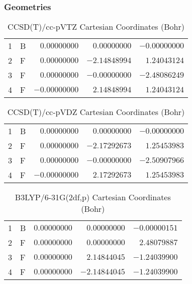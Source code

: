 \documentclass[10pt,oneside]{article}
\begin{document}
\clearpage

\subsection{\ \ \ }

\subsubsection*{Geometries}
\begin{table}[h!]
\centering
\caption{CCSD(T)/cc-pVTZ Cartesian Coordinates (Bohr)}
\begin{tabular}{llrrr}
1  & B  & $ 0.00000000$ & $ 0.00000000$ & $-0.00000000$ \\
2  & F  & $ 0.00000000$ & $-2.14848994$ & $ 1.24043124$ \\
3  & F  & $ 0.00000000$ & $-0.00000000$ & $-2.48086249$ \\
4  & F  & $-0.00000000$ & $ 2.14848994$ & $ 1.24043124$ \\
\end{tabular}
\end{table}

\begin{table}[h!]
\centering
\caption{CCSD(T)/cc-pVDZ Cartesian Coordinates (Bohr)}
\begin{tabular}{llrrr}
1  & B  & $ 0.00000000$ & $ 0.00000000$ & $-0.00000000$ \\
2  & F  & $ 0.00000000$ & $-2.17292673$ & $ 1.25453983$ \\
3  & F  & $ 0.00000000$ & $-0.00000000$ & $-2.50907966$ \\
4  & F  & $-0.00000000$ & $ 2.17292673$ & $ 1.25453983$ \\
\end{tabular}
\end{table}

\begin{table}[h!]
\centering
\caption{B3LYP/6-31G(2df,p) Cartesian Coordinates (Bohr)}
\begin{tabular}{llrrr}
1  & B  & $ 0.00000000$ & $ 0.00000000$ & $-0.00000151$ \\
2  & F  & $ 0.00000000$ & $ 0.00000000$ & $ 2.48079887$ \\
3  & F  & $ 0.00000000$ & $ 2.14844045$ & $-1.24039900$ \\
4  & F  & $ 0.00000000$ & $-2.14844045$ & $-1.24039900$ \\
\end{tabular}
\end{table}
\end{document}
